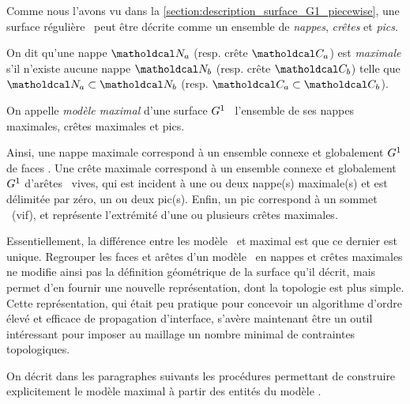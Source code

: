 Comme nous l'avons vu dans la \autoref{section:description_surface_G1_piecewise}, une surface régulière \piecewise\ peut être décrite comme un ensemble de \textit{nappes}, \textit{crêtes} et \textit{pics}. \par 

\begin{definition}
	On dit qu'une nappe $\nappe_a$ (resp. crête $\crete_a$) est \emph{maximale} s'il n'existe aucune nappe $\nappe_b$ (resp. crête $\crete_b$) telle que $\nappe_a \subset \nappe_b$ (resp. $\crete_a \subset \crete_b$). \par
	On appelle \emph{modèle maximal} d'une surface $G^{1}$ \piecewise\ l'ensemble de ses nappes maximales, crêtes maximales et pics.
\end{definition}

Ainsi, une nappe maximale correspond à un ensemble connexe et globalement $G^{1}$ de faces \brep. 
Une crête maximale correspond à un ensemble connexe et globalement $G^{1}$ d'arêtes \brep\ vives, qui est incident à une ou deux nappe(s) maximale(s) et est délimitée par zéro, un ou deux pic(s).
Enfin, un pic correspond à un sommet \brep\ (vif), et représente l'extrémité d'une ou plusieurs crêtes maximales.\par
Essentiellement, la différence entre les modèle \brep\ et maximal est que ce dernier est unique. 
Regrouper les faces et arêtes d'un modèle \brep\ en nappes et crêtes maximales ne modifie ainsi pas la définition géométrique de la surface qu'il décrit, mais permet d'en fournir une nouvelle représentation, dont la topologie est plus simple. 
Cette représentation, qui était peu pratique pour concevoir un algorithme d'ordre élevé et efficace de propagation d'interface, s'avère maintenant être un outil intéressant pour imposer au maillage un nombre minimal de contraintes topologiques.\par
On décrit dans les paragraphes suivants les procédures permettant de construire explicitement le modèle maximal à partir des entités du modèle \brep.

